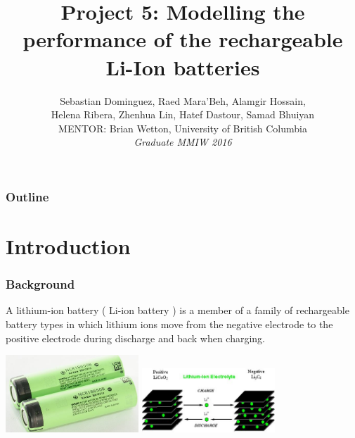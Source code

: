\documentclass{beamer}
\title[Project 5]{Project 5: Modelling the performance of the rechargeable Li-Ion batteries}
\author[]{Sebastian Dominguez,
\quad Raed Mara'Beh,
\quad Alamgir Hossain,\\
\quad Helena Ribera,
\quad Zhenhua Lin,
\quad Hatef Dastour,
\quad Samad Bhuiyan\\
\vspace{0.5cm} MENTOR: Brian Wetton, University of British Columbia\\
{\it Graduate MMIW 2016}}
\begin{document}
\begin{frame}
 \titlepage
\end{frame}

\begin{frame}
 \frametitle{Outline}
 \tableofcontents
\end{frame}

\section{Introduction}
\begin{frame}
 \frametitle{Background}
{\Large
A lithium-ion battery ( Li-ion battery ) is a member of a family of rechargeable battery types in which lithium ions move from the negative electrode to the positive electrode during discharge and back when charging.}

\vspace{1cm}

\centering
\includegraphics[width=5cm]{DSC_2680.jpg}
\quad \includegraphics[width=5cm]{swingcell.jpg}
\end{frame}
\end{document}
